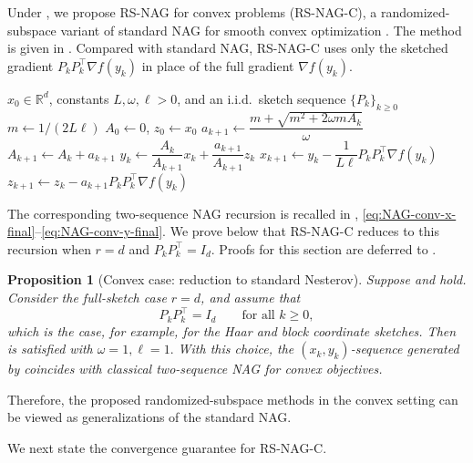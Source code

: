 \documentclass[10pt]{article}
\newtheorem{proposition}[proposition]{Proposition}
\begin{document}
Under , we propose RS-NAG for convex problems
(RS-NAG-C), a randomized-subspace variant of standard NAG for smooth convex
optimization \cite{nesterov1983,nesterov2004intro}. The method is given in
. Compared with standard NAG, RS-NAG-C uses only the sketched gradient
\(P_kP_k^\top\nabla f(y_k)\) in place of the full gradient \(\nabla f(y_k)\).

\begin{algorithm}[t]
\caption{RS-NAG-C}
\label{alg:rs-NAG-c}
\begin{algorithmic}[1]
\Require \(x_0\in\mathbb{R}^d\), constants \(L,\omega,\ell>0\), and an i.i.d.\ sketch sequence \(\{P_k\}_{k\ge0}\)
\State \(m \gets 1/(2L\ell)\)
\State \(A_0 \gets 0\), \(z_0 \gets x_0\)
    \State \(a_{k+1} \gets \dfrac{m+\sqrt{m^2+2\omega m A_k}}{\omega}\)
    \State \(A_{k+1} \gets A_k+a_{k+1}\)
    \State \(y_k \gets \dfrac{A_k}{A_{k+1}}x_k+\dfrac{a_{k+1}}{A_{k+1}}z_k\)
    \State \(x_{k+1} \gets y_k-\dfrac{1}{L\ell}P_kP_k^\top \nabla f(y_k)\)
    \State \(z_{k+1} \gets z_k-a_{k+1}P_kP_k^\top \nabla f(y_k)\)
\EndFor
\end{algorithmic}
\end{algorithm}




The corresponding two-sequence NAG recursion is recalled in
,
\eqref{eq:NAG-conv-x-final}--\eqref{eq:NAG-conv-y-final}. We prove below that
RS-NAG-C reduces to this recursion when \(r=d\) and \(P_kP_k^\top=I_d\).
Proofs for this section are deferred to .

\begin{proposition}[Convex case: reduction to standard Nesterov]
\label{prop:convex-reduction-nesterov}
Suppose  and
 hold. Consider the full-sketch case \(r=d\), and assume
that
\[
P_kP_k^\top=I_d
\qquad\text{for all }k\ge0,
\]
which is the case, for example, for the Haar and block coordinate sketches.
Then  is satisfied with
\(
\omega=1, \ell=1.
\)
With this choice, the \((x_k,y_k)\)-sequence generated by
 coincides with classical two-sequence
NAG for convex objectives.
\end{proposition}

Therefore, the proposed randomized-subspace methods in the convex setting
can be viewed as generalizations of the standard NAG.

We next state the convergence guarantee for RS-NAG-C.
\end{document}
